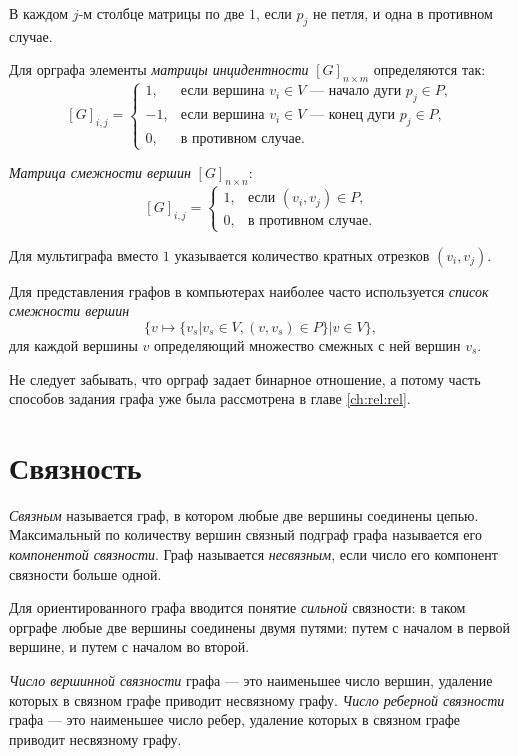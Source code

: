 В каждом $j$-м столбце матрицы по две $1$, если $p_j$ не петля, и одна в противном случае. 

Для орграфа элементы \emph{матрицы инцидентности} $[G]_{n\times m}$ определяются так:
\[
    [G]_{i,j}=
    \begin{cases}
         1, &\text{если вершина $v_i\in V$ --- начало дуги $p_j\in P$},\\
        -1, &\text{если вершина $v_i\in V$ --- конец дуги $p_j\in P$},\\
         0, &\text{в противном случае.}
    \end{cases}
\]

\emph{Матрица смежности вершин} $[G]_{n\times n}$:
\[
    [G]_{i,j}=
    \begin{cases}
         1, &\text{если $(v_i,v_j)\in P$},\\
         0, &\text{в противном случае.}
    \end{cases}
\]

Для мультиграфа вместо $1$ указывается количество кратных отрезков $(v_i,v_j)$.

Для представления графов в компьютерах наиболее часто используется \emph{список смежности вершин} 
\[
    \{v\mapsto \{v_s|v_s\in V,(v,v_s)\in P\}|v\in V\},
\]
для каждой вершины $v$ определяющий множество смежных с ней вершин $v_s$.

Не следует забывать, что орграф задает бинарное отношение, а потому часть способов задания графа уже была рассмотрена в главе \ref{ch:rel:rel}.


\section{Связность}

\emph{Связным} называется граф, в котором любые две вершины соединены цепью. Максимальный по количеству вершин связный подграф графа называется его \emph{компонентой связности}. Граф называется \emph{несвязным}, если число его компонент связности больше одной. 

Для ориентированного графа вводится понятие \emph{сильной} связности: в таком орграфе любые две вершины соединены двумя путями: путем с началом в первой вершине, и путем с началом во второй.

\emph{Число вершинной связности} графа --- это наименьшее число вершин, удаление которых в связном графе приводит несвязному графу. \emph{Число реберной связности} графа --- это наименьшее число ребер, удаление которых в связном графе приводит несвязному графу.

